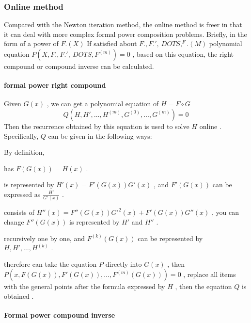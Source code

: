 \subsubsection { Online method }

Compared with the Newton iteration method, the online method is freer in that it can deal with more complex formal power composition problems. Briefly, in the form of a power of $ F. (X) $ If satisfied about $ F., F. ', \ DOTS , ^ F. {(M)} $ polynomial equation $ P (X, F., F.', \ DOTS , F^{(m)})= 0 $ , based on this equation, the right compound or compound inverse can be calculated.

\paragraph { formal power right compound }

Given $ G(x) $ , we can get a polynomial equation of $ H=F \circ G $
$$ Q(H,H', \dots ,H^{(m)},G^{(0)}, \dots ,G^{(m)})= 0 $$
Then the recurrence obtained by this equation is used to solve $ H $ online . Specifically, $ Q $ can be given in the following ways:
\begin { enumerate }
By definition, \item has $ F(G(x)) = H(x) $ .
\item is represented by $ H'(x) = F'(G(x))G'(x) $ , and $ F'(G(x)) $ can be expressed as $ \frac {H'}{G'( x)} $ .
\item consists of $ H''(x) = F''(G(x))G'^ 2 (x) + F'(G(x))G''(x) $ , you can change $ F'' (G(x)) $ is represented by $ H' $ and $ H'' $ .
\item recursively one by one, and $ F^{(k)}(G(x)) $ can be represented by $ H,H', \dots ,H^{(k)} $ .
\item therefore can take the equation $ P $ directly into $ G(x) $ , then $ P(x,F(G(x)),F'(G(x)), \dots ,F^{( m)}(G(x))) = 0 $ , replace all items with the general points after the formula expressed by $ H $ , then the equation $ Q $ is obtained .
\end { enumerate }

\paragraph { Formal power compound inverse }

